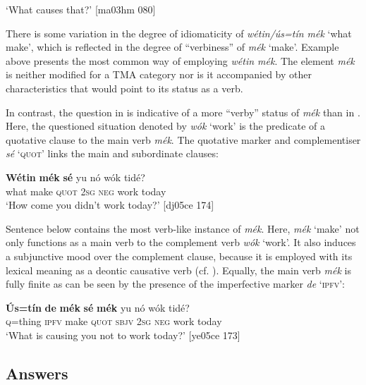 \glt ‘What causes that?’ [ma03hm 080]
\z

There is some variation in the degree of idiomaticity of \textit{wétin/ús=tín mék} ‘what make’, which is reflected in the degree of “verbiness” of \textit{mék} ‘make’. Example  above presents the most common way of employing \textit{wétin mék}. The element \textit{mék} is neither modified for a TMA category nor is it accompanied by other characteristics that would point to its status as a verb. 


In contrast, the question in  is indicative of a more “verby” status of \textit{mék} than in . Here, the questioned situation denoted by \textit{wók} ‘work’ is the predicate of a quotative clause to the main verb \textit{mék}. The quotative marker and complementiser \textit{sé} ‘\textsc{quot}’ links the main and subordinate clauses: 



\ea%
    \label{ex:key:648}
    \gll \textbf{Wétin}  \textbf{mék}    \textbf{sé}    yu  nó  wók    tidé?\\
what  make  \textsc{quot}    \textsc{2sg}  \textsc{neg}  work  today\\

\glt ‘How come you didn’t work today?’ [dj05ce 174]
\z

Sentence  below contains the most verb-like instance of \textit{mék}. Here, \textit{mék} ‘make’ not only functions as a main verb to the complement verb \textit{wók} ‘work’. It also induces a subjunctive mood over the complement clause, because it is employed with its lexical meaning as a deontic causative verb (cf. ). Equally, the main verb \textit{mék} is fully finite as can be seen by the presence of the imperfective marker \textit{de} ‘\textsc{ipfv}’:


\ea%
    \label{ex:key:649}
    \gll \textbf{\'{U}s=tín}  \textbf{de}  \textbf{mék}    \textbf{sé}   \textbf{mék}    yu  nó  wók    tidé?\\
\textsc{q}=thing  \textsc{ipfv}  make  \textsc{quot}    \textsc{sbjv}    \textsc{2sg}  \textsc{neg}  work  today\\

\glt ‘What is causing you not to work today?’ [ye05ce 173]
\z

\subsection{Answers}\label{sec:7.3.3}

